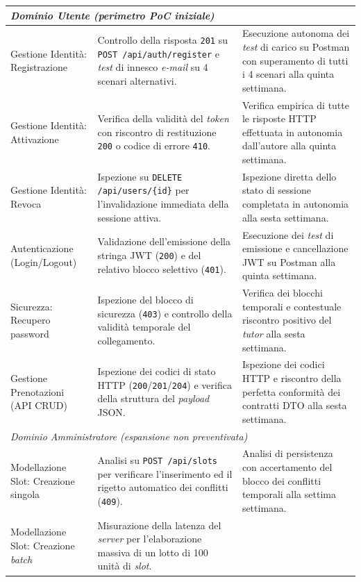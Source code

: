 {\begin{longtable}{p{} p{} p{}}
    \multicolumn{3}{l}{\textit{Dominio Utente (perimetro PoC iniziale)}} \\
    \hline
    Gestione Identità: Registrazione &
    Controllo della risposta \texttt{201} su \texttt{POST /api/auth/register} e \textit{test} di innesco \textit{e-mail} su 4 scenari alternativi. & 
    Esecuzione autonoma dei \textit{test} di carico su Postman con superamento di tutti i 4 scenari alla quinta settimana. \\
    \hline
    Gestione Identità: Attivazione &
    Verifica della validità del \textit{token} con riscontro di restituzione \texttt{200} o codice di errore \texttt{410}. & 
    Verifica empirica di tutte le risposte HTTP effettuata in autonomia dall'autore alla quinta settimana. \\
    \hline
    Gestione Identità: Revoca &
    Ispezione su \texttt{DELETE /api/users/\{id\}} per l'invalidazione immediata della sessione attiva. & 
    Ispezione diretta dello stato di sessione completata in autonomia alla sesta settimana. \\
    \hline
    Autenticazione (Login/Logout) &
    Validazione dell'emissione della stringa JWT (\texttt{200}) e del relativo blocco selettivo (\texttt{401}). & 
    Esecuzione dei \textit{test} di emissione e cancellazione JWT su Postman alla quinta settimana. \\
    \hline
    Sicurezza: Recupero password &
    Ispezione del blocco di sicurezza (\texttt{403}) e controllo della validità temporale del collegamento. & 
    Verifica dei blocchi temporali e contestuale riscontro positivo del \textit{tutor} alla sesta settimana. \\
    \hline
    Gestione Prenotazioni (API CRUD) &
    Ispezione dei codici di stato HTTP (\texttt{200}/\texttt{201}/\texttt{204}) e verifica della struttura del \textit{payload} JSON. & 
    Ispezione dei codici HTTP e riscontro della perfetta conformità dei contratti DTO alla sesta settimana. \\
    \hline
    \multicolumn{3}{l}{\textit{Dominio Amministratore (espansione non preventivata)}} \\
    \hline
    Modellazione Slot: Creazione singola &
    Analisi su \texttt{POST /api/slots} per verificare l'inserimento ed il rigetto automatico dei conflitti (\texttt{409}). & 
    Analisi di persistenza con accertamento del blocco dei conflitti temporali alla settima settimana. \\
    \hline
    Modellazione Slot: Creazione \textit{batch} &
    Misurazione della latenza del \textit{server} per l'elaborazione massiva di un lotto di 100 unità di \textit{slot}. & 

\end{longtable}}

